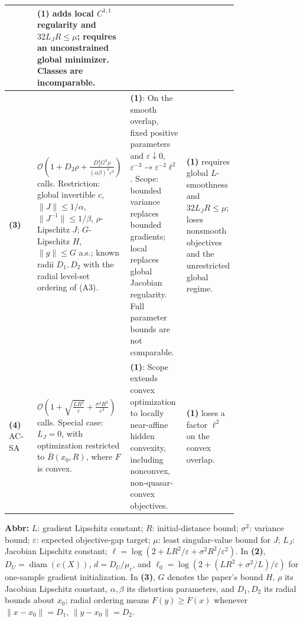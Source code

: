 \begin{table}[tp]
\begin{threeparttable}
\begin{tabularx}{\linewidth}{@{}>{\raggedright\arraybackslash}p{0.20\linewidth}>{\raggedright\arraybackslash}p{0.32\linewidth}>{\raggedright\arraybackslash}p{0.25\linewidth}>{\raggedright\arraybackslash}X@{}}
& \textbf{(1)} adds local $C^{1,1}$ regularity and $32L_JR\le\mu$; requires an unconstrained global minimizer. Classes are incomparable. \\
\midrule
\textbf{(3)} \citep[Thm.~5.4]{lhcsBhaskara2025}
& $\mathcal{O}\!\left(1+D_2\rho+\frac{D_2^4G^3\rho}{(\alpha\beta)^4\varepsilon^3}\right)$ calls. Restriction: global invertible $c$, $\|J\|\le1/\alpha$, $\|J^{-1}\|\le1/\beta$, $\rho$-Lipschitz $J$; $G$-Lipschitz $H$, $\|g\|\le G$ a.s.; known radii $D_1,D_2$ with the radial level-set ordering of (A3).
& \textbf{(1)}: On the smooth overlap, fixed positive parameters and $\varepsilon\downarrow0$, $\varepsilon^{-3}\to\varepsilon^{-2}\ell^2$. Scope: bounded variance replaces bounded gradients; local replaces global Jacobian regularity. Full parameter bounds are not comparable.
& \textbf{(1)} requires global $L$-smoothness and $32L_JR\le\mu$; loses nonsmooth objectives and the unrestricted global regime. \\
\midrule
\textbf{(4)} AC-SA \citep[Cor.~1]{lhcsLan2012}
& $\mathcal{O}\!\left(1+\sqrt{\frac{LR^2}{\varepsilon}}+\frac{\sigma^2R^2}{\varepsilon^2}\right)$ calls. Special case: $L_J=0$, with optimization restricted to $\overline B(x_0,R)$, where $F$ is convex.
& \textbf{(1)}: Scope extends convex optimization to locally near-affine hidden convexity, including nonconvex, non-quasar-convex objectives.
& \textbf{(1)} loses a factor $\ell^2$ on the convex overlap. \\
\bottomrule
\end{tabularx}
\begin{tablenotes}[flushleft]\footnotesize
\item[] \textbf{Abbr:} $L$: gradient Lipschitz constant; $R$: initial-distance bound; $\sigma^2$: variance bound; $\varepsilon$: expected objective-gap target; $\mu$: least singular-value bound for $J$; $L_J$: Jacobian Lipschitz constant; $\ell=\log(2+LR^2/\varepsilon+\sigma^2R^2/\varepsilon^2)$. In \textbf{(2)}, $D_U=\operatorname{diam}(c(X))$, $d=D_U/\mu_c$, and $\ell_0=\log(2+(LR^2+\sigma^2/L)/\varepsilon)$ for one-sample gradient initialization. In \textbf{(3)}, $G$ denotes the paper's bound $H$, $\rho$ its Jacobian Lipschitz constant, $\alpha,\beta$ its distortion parameters, and $D_1,D_2$ its radial bounds about $x_0$; radial ordering means $F(y)\ge F(x)$ whenever $\|x-x_0\|=D_1$, $\|y-x_0\|=D_2$.
\end{tablenotes}
\end{threeparttable}
\end{table}
\clearpage
